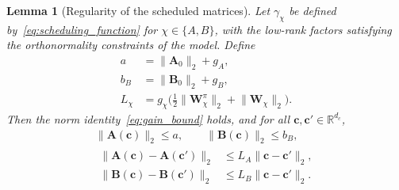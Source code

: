 \documentclass[journal]{IEEEtran}
\newcommand{\vc}{\mathbf{c}}
\newcommand{\mA}{\mathbf{A}}
\newcommand{\mB}{\mathbf{B}}
\newcommand{\mW}{\mathbf{W}}
\newcommand{\R}{\mathbb{R}}
\newcommand{\norm}[2][]{\mathopen{#1\lVert}#2\mathclose{#1\rVert}}
\theoremstyle{plain}
\newtheorem{lemma}{Lemma}
\theoremstyle{definition}
\theoremstyle{definition}
\begin{document}
\begin{lemma}[Regularity of the scheduled matrices]
\label{lem:scheduling_regularity}
Let $\gamma_\chi$ be defined by~\eqref{eq:scheduling_function} for
$\chi\in\{A,B\}$, with the low-rank factors satisfying the
orthonormality constraints of the model. Define
\begin{equation}
\begin{aligned}
a&=\norm{\mA_0}_2+g_A,\\
b_B&=\norm{\mB_0}_2+g_B,\\
L_\chi&=g_\chi\Big(\tfrac12\norm{\mW_\chi^\pi}_2+\norm{\mW_\chi}_2\Big).
\end{aligned}
\label{eq:regularity_constants}
\end{equation}
Then the norm identity~\eqref{eq:gain_bound} holds, and for all
$\vc,\vc'\in\R^{d_c}$,
\begin{gather}
\norm{\mA(\vc)}_2\le a,\qquad\norm{\mB(\vc)}_2\le b_B,
\label{eq:uniform_matrix_bound}\\
\begin{aligned}
\norm{\mA(\vc)-\mA(\vc')}_2&\le L_A\norm{\vc-\vc'}_2,\\
\norm{\mB(\vc)-\mB(\vc')}_2&\le L_B\norm{\vc-\vc'}_2.
\end{aligned}
\label{eq:scheduled_lipschitz}
\end{gather}
\end{lemma}
\end{document}
